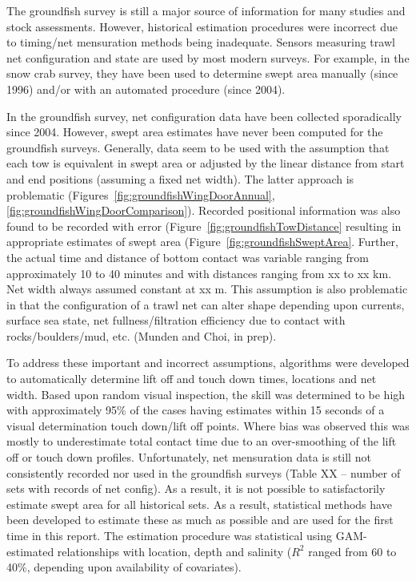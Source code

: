 \documentclass[letterpaper,portrait,11pt]{scrartcl}
\numberwithin{equation}{section}		%
\numberwithin{figure}{section}		%
\numberwithin{table}{section}				%
\begin{document}
The groundfish survey is still a major source of information for many studies and stock assessments. However, historical estimation procedures were incorrect due to timing/net mensuration methods being inadequate. Sensors measuring trawl net configuration and state are used by most modern surveys. For example, in the snow crab survey, they have been used to determine swept area manually (since 1996) and/or with an automated procedure (since 2004).

In the groundfish survey, net configuration data have been collected sporadically since 2004. However, swept area estimates have never been computed for the groundfish surveys. Generally, data seem to be used with the assumption that each tow is equivalent in swept area or adjusted by the linear distance from start and end positions (assuming a fixed net width). The latter approach is problematic (Figures~\ref{fig:groundfishWingDoorAnnual}, \ref{fig:groundfishWingDoorComparison}). Recorded positional information was also found to be recorded with error (Figure~\ref{fig:groundfishTowDistance} resulting in appropriate estimates of swept area (Figure~\ref{fig:groundfishSweptArea}. Further, the actual time and distance of bottom contact was variable ranging from approximately 10 to 40 minutes and with distances ranging from xx to xx km. Net width always assumed constant at xx m. This assumption is also problematic in that the configuration of a trawl net can alter shape depending upon currents, surface sea state, net fullness/filtration efficiency due to contact with rocks/boulders/mud, etc. (Munden and Choi, in prep). 

To address these important and incorrect assumptions, algorithms were developed to automatically determine lift off and touch down times, locations and net width. Based upon random visual inspection, the skill was determined to be high with approximately 95\% of the cases having estimates within 15 seconds of a visual determination touch down/lift off points. Where bias was observed this was mostly to underestimate total contact time due to an over-smoothing of the lift off or touch down profiles. Unfortunately, net mensuration data is still not consistently recorded nor used in the groundfish surveys (Table XX -- number of sets with records of net config). As a result, it is not possible to satisfactorily estimate swept area for all historical sets. As a result, statistical methods have been developed to estimate these as much as possible and are used for the first time in this report. The estimation procedure was statistical using GAM-estimated relationships with location, depth and salinity ($R^2$ ranged from 60 to 40\%, depending upon availability of covariates). 
\end{document}
